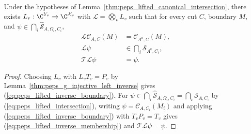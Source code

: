 \begin{lemma}%
    \label{thm:peps_lifted_common_inverse}
    \leanok
    Under the hypotheses of
    Lemma~\ref{thm:peps_lifted_canonical_intersection}, there exists
    $L_v:\C^{Y_v}\to\C^{\mathcal X_v}$ with $\mathcal L=\bigotimes_vL_v$ such
    that for every cut $C$, boundary $M$, and
    $\psi\in\bigcap_i\widehat{\mathcal S}_{A,\Omega_i,C_i}$,
    \begin{align}
        \mathcal L\mathcal C_{A,C}(M) & =\mathcal C_{A^0,C}(M),
        \label{eq:peps_lifted_inverse_boundary}                           \\
        \mathcal L\psi                & \in\bigcap_i\mathcal S_{A^0,C_i},
        \label{eq:peps_lifted_inverse_membership}                         \\
        \mathcal T\mathcal L\psi      & =\psi.
        \nonumber
    \end{align}
\end{lemma}
\begin{proof}\leanok
    Choosing $L_v$ with $L_vT_v=P_v$ by
    Lemma~\ref{thm:peps_g_injective_left_inverse} gives
    (\ref{eq:peps_lifted_inverse_boundary}). For
    $\psi\in\bigcap_i\widehat{\mathcal S}_{A,\Omega_i,C_i}=\bigcap_i\mathcal S_{A,C_i}$
    by (\ref{eq:peps_lifted_intersection}), writing $\psi=\mathcal C_{A,C_i}(M_i)$
    and applying (\ref{eq:peps_lifted_inverse_boundary}) with $T_vP_v=T_v$ gives
    (\ref{eq:peps_lifted_inverse_membership}) and $\mathcal T\mathcal L\psi=\psi$.
\end{proof}
